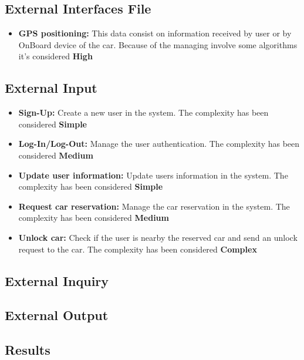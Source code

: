 \subsection{External Interfaces File} %

\begin{itemize}
	\item \textbf{GPS positioning:} This data consist on information received by user or by OnBoard device of the car. Because of the managing involve some algorithms it's considered \textbf{High}
\end{itemize}


\subsection{External Input} %
\begin{itemize}
	\item \textbf{Sign-Up:} Create a new user in the system. The complexity has been considered \textbf{Simple}
	\item \textbf{Log-In/Log-Out:} Manage the user authentication. The complexity has been considered \textbf{Medium}
	\item \textbf{Update user information:} Update users information in the system. The complexity has been considered \textbf{Simple}
	\item \textbf{Request car reservation:} Manage the car reservation in the system. The complexity has been considered \textbf{Medium}
	\item \textbf{Unlock car:} Check if the user is nearby the reserved car and send an unlock request to the car. The complexity has been considered \textbf{Complex}
\end{itemize}


\subsection{External Inquiry} %

\subsection{External Output} %



\subsection{Results} %


